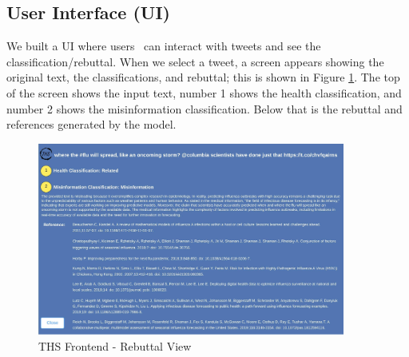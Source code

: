 \subsection{User Interface (UI)}
We built a UI where users  can interact with tweets and see the classification/rebuttal. When we select a tweet, a screen appears showing the original text, the classifications, and rebuttal; this is shown in Figure \ref{fig:frontendrebuttal}. The top of the screen shows the input text, number 1 shows the health classification, and number 2 shows the misinformation classification. Below that is the rebuttal and references generated by the model. %
\begin{figure}[!htb]
	\begin{center}
		\includegraphics[width=0.9\textwidth]{figures/THS_Rebuttal_view.jpeg} %
	\end{center}
	\caption{THS Frontend  - Rebuttal View} %
	\label{fig:frontendrebuttal}
\end{figure}






